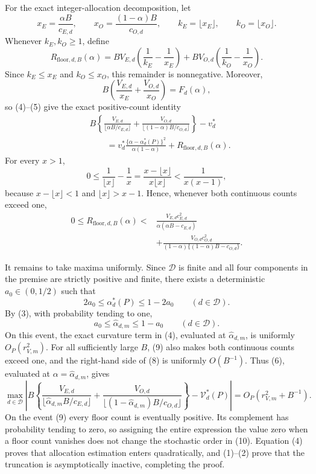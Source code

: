For the exact integer-allocation decomposition, let
\[
 x_E=\frac{\alpha B}{c_{E,d}},\qquad
 x_O=\frac{(1-\alpha)B}{c_{O,d}},
 \qquad k_E=\lfloor x_E\rfloor,
 \qquad k_O=\lfloor x_O\rfloor.
\]
Whenever \(k_E,k_O\ge1\), define
\[
 R_{\mathrm{floor},d,B}(\alpha)
 =B V_{E,d}\left(\frac1{k_E}-\frac1{x_E}\right)
 +B V_{O,d}\left(\frac1{k_O}-\frac1{x_O}\right).                 \tag{5}
\]
Since \(k_E\le x_E\) and \(k_O\le x_O\), this remainder is nonnegative.  Moreover,
\[
 B\left(\frac{V_{E,d}}{x_E}+\frac{V_{O,d}}{x_O}\right)
 =F_d(\alpha),
\]
so (4)--(5) give the exact positive-count identity
\[
\begin{aligned}
 &B\left\{\frac{V_{E,d}}{\lfloor\alpha B/c_{E,d}\rfloor}
 +\frac{V_{O,d}}{\lfloor(1-\alpha)B/c_{O,d}\rfloor}\right\}
 -v_d^*\\
 &\qquad={}
 v_d^*\frac{\{\alpha-\alpha_d^*(P)\}^2}{\alpha(1-\alpha)}
 +R_{\mathrm{floor},d,B}(\alpha).                                 \tag{6}
\end{aligned}
\]
For every \(x>1\),
\[
 0\le \frac1{\lfloor x\rfloor}-\frac1x
 =\frac{x-\lfloor x\rfloor}{x\lfloor x\rfloor}
 <\frac1{x(x-1)},                                                   \tag{7}
\]
because \(x-\lfloor x\rfloor<1\) and \(\lfloor x\rfloor>x-1\).  Hence, whenever both continuous counts exceed one,
\[
\begin{aligned}
 0\le R_{\mathrm{floor},d,B}(\alpha)
 <{}&\frac{V_{E,d}c_{E,d}^2}
 {\alpha(\alpha B-c_{E,d})}\\
 &+\frac{V_{O,d}c_{O,d}^2}
 {(1-\alpha)\{(1-\alpha)B-c_{O,d}\}}.                            \tag{8}
\end{aligned}
\]

It remains to take maxima uniformly.  Since \(\mathcal D\) is finite and all four components in the premise are strictly positive and finite, there exists a deterministic \(a_0\in(0,1/2)\) such that
\[
 2a_0\le \alpha_d^*(P)\le1-2a_0
 \qquad(d\in\mathcal D).
\]
By (3), with probability tending to one,
\[
 a_0\le\widehat\alpha_{d,m}\le1-a_0
 \qquad(d\in\mathcal D).                                         \tag{9}
\]
On this event, the exact curvature term in (4), evaluated at \(\widehat\alpha_{d,m}\), is uniformly \(O_P(r_{V,m}^2)\).  For all sufficiently large \(B\), (9) also makes both continuous counts exceed one, and the right-hand side of (8) is uniformly \(O(B^{-1})\).  Thus (6), evaluated at \(\alpha=\widehat\alpha_{d,m}\), gives
\[
\max_{d\in\mathcal D}\left|B\left\{
\frac{V_{E,d}}{\lfloor\widehat\alpha_{d,m}B/c_{E,d}\rfloor}
+\frac{V_{O,d}}{\lfloor(1-\widehat\alpha_{d,m})B/c_{O,d}\rfloor}
\right\}-\mathcal V_d^*(P)\right|
=O_P(r_{V,m}^2+B^{-1}).                                            \tag{10}
\]
On the event (9) every floor count is eventually positive.  Its complement has probability tending to zero, so assigning the entire expression the value zero when a floor count vanishes does not change the stochastic order in (10).  Equation (4) proves that allocation estimation enters quadratically, and (1)--(2) prove that the truncation is asymptotically inactive, completing the proof.